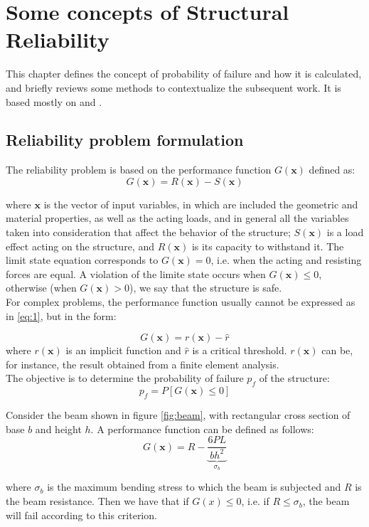\chapter{Some concepts of Structural Reliability}
\label{ch:2}
This chapter defines the concept of probability of failure and how it is calculated, and briefly reviews some methods to contextualize the subsequent work. It is based mostly on \citep{Hurtado2013} and \citep{Melchers2018}.\\

\section{Reliability problem formulation}
The reliability problem is based on the performance function $G(\bm{x})$ defined as:
\begin{equation} \label{eq:1}
    G(\bm{x})=R(\bm{x}) - S(\bm{x})
\end{equation}

where $\bm{x}$ is the vector of input variables, in which are included the geometric and material properties, as well as the acting loads, and in general all the variables taken into consideration that affect the behavior of the structure; $S(\bm{x})$ is a load effect acting on the structure, and $R(\bm{x})$ is its capacity to withstand it. The limit state equation corresponds to $G(\bm{x})=0$, i.e. when the acting and resisting forces are equal. A violation of the limite state occurs when $G(\bm{x}) \leq 0$, otherwise (when $G(\bm{x}) > 0$), we say that the structure is safe. \\

For complex problems, the performance function usually cannot be expressed as in \ref{eq:1}, but in the form:

\begin{equation}
    G(\bm{x}) = r(\bm{x}) - \hat{r}
\end{equation}
where $r(\bm{x})$ is an implicit function and $\hat{r}$ is a critical threshold. $r(\bm{x})$ can be, for instance, the result obtained from a finite element analysis. \\

The objective is to determine the probability of failure $p_f$ of the structure:
\begin{equation} \label{eq:pf}
p_f = P[G(\bm{x}) \leq 0]    
\end{equation}

\begin{testexample}
Consider the beam shown in figure \ref{fig:beam}, with rectangular cross section of base $b$ and height $h$. A performance function can be defined as follows:
\begin{equation} \label{eq:example}
    G(\bm{x})=R - \underbrace{\frac{6PL}{bh^2}}_{\sigma_b}
\end{equation}


where $\sigma_b$ is the maximum bending stress to which the beam is subjected and $R$ is the beam resistance. Then we have that if $G(x) \leq 0$, i.e. if $R \leq \sigma_b$, the beam will fail according to this criterion.
\end{testexample}

